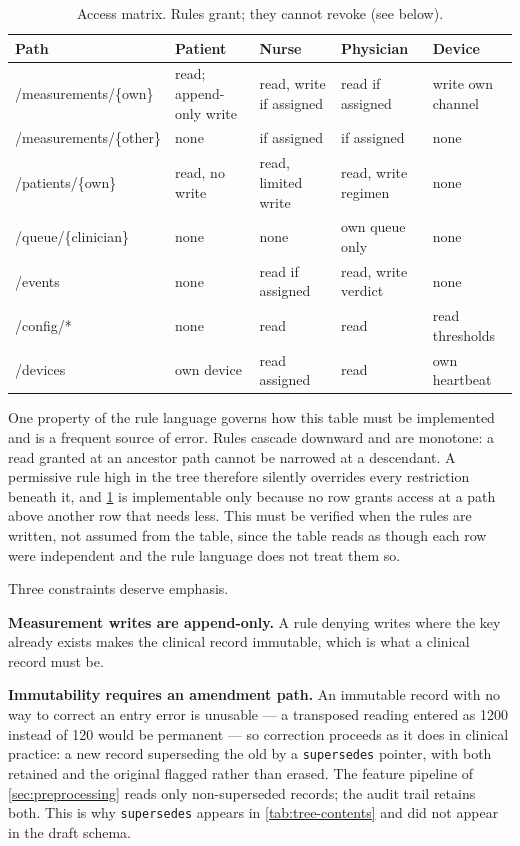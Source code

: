 \documentclass[12pt,a4paper,oneside]{report}
\begin{document}
\begin{table}[htbp]
\centering\footnotesize
\caption{Access matrix. Rules grant; they cannot revoke (see below).}\label{tab:access-matrix}
\begin{tabularx}{\textwidth}{@{}>{\raggedright\arraybackslash\ttfamily\scriptsize}p{3.4cm} >{\raggedright\arraybackslash}p{2.4cm} >{\raggedright\arraybackslash}p{2.2cm} >{\raggedright\arraybackslash}p{2.2cm} X@{}}
\toprule
\normalfont\textbf{Path} & \textbf{Patient} & \textbf{Nurse} & \textbf{Physician} & \textbf{Device} \\
\midrule
/measurements/\{own\} & read; append-only write & read, write if assigned & read if assigned & write own channel \\
/measurements/\{other\} & none & if assigned & if assigned & none \\
/patients/\{own\} & read, no write & read, limited write & read, write regimen & none \\
/queue/\{clinician\} & none & none & own queue only & none \\
/events & none & read if assigned & read, write verdict & none \\
/config/* & none & read & read & read thresholds \\
/devices & own device & read assigned & read & own heartbeat \\
\bottomrule
\end{tabularx}
\end{table}

One property of the rule language governs how this table must be implemented and is a frequent source of error. Rules cascade downward and are monotone: a read granted at an ancestor path cannot be narrowed at a descendant. A permissive rule high in the tree therefore silently overrides every restriction beneath it, and \cref{tab:access-matrix} is implementable only because no row grants access at a path above another row that needs less. This must be verified when the rules are written, not assumed from the table, since the table reads as though each row were independent and the rule language does not treat them so.

Three constraints deserve emphasis.

\textbf{Measurement writes are append-only.} A rule denying writes where the key already exists makes the clinical record immutable, which is what a clinical record must be.

\textbf{Immutability requires an amendment path.} An immutable record with no way to correct an entry error is unusable --- a transposed reading entered as 1200 instead of 120 would be permanent --- so correction proceeds as it does in clinical practice: a new record superseding the old by a \texttt{supersedes} pointer, with both retained and the original flagged rather than erased. The feature pipeline of \cref{sec:preprocessing} reads only non-superseded records; the audit trail retains both. This is why \texttt{supersedes} appears in \cref{tab:tree-contents} and did not appear in the draft schema.
\end{document}

